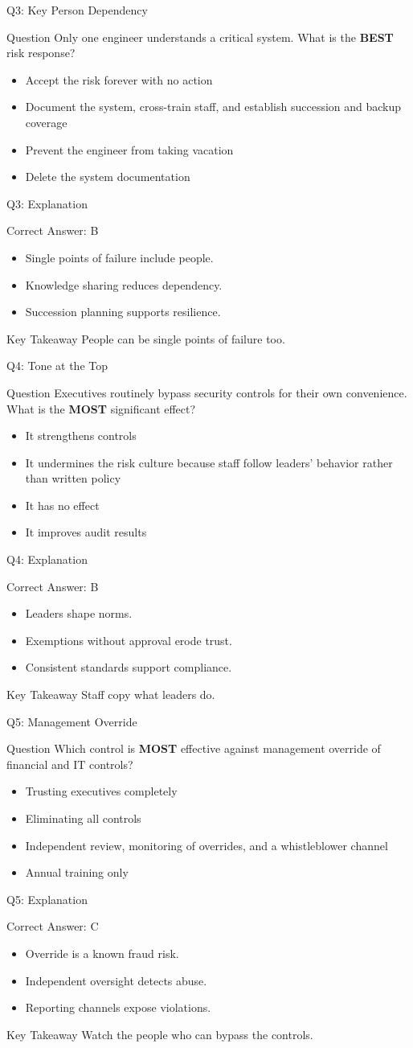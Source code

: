 \documentclass[aspectratio=169]{beamer}
\newcommand{\hq}[7]{%
	\begin{frame}{Q#1: #2}
		\begin{block}{Question}
			#3
		\end{block}
		\begin{itemize}
			#4
		\end{itemize}
	\end{frame}
	\begin{frame}{Q#1: Explanation}
		\begin{block}{Correct Answer: #5}
			\begin{itemize}
				#6
			\end{itemize}
		\end{block}
		\begin{alertblock}{Key Takeaway}
			#7
		\end{alertblock}
	\end{frame}
}
\begin{document}
	\hq{3}{Key Person Dependency}
	{Only one engineer understands a critical system. What is the \textbf{BEST} risk response?}
	{\item[\textbf{(A)}] Accept the risk forever with no action
		\item[\textbf{(B)}] Document the system, cross-train staff, and establish succession and backup coverage
		\item[\textbf{(C)}] Prevent the engineer from taking vacation
		\item[\textbf{(D)}] Delete the system documentation}
	{B}
	{\item Single points of failure include people.
		\item Knowledge sharing reduces dependency.
		\item Succession planning supports resilience.}
	{People can be single points of failure too.}

	\hq{4}{Tone at the Top}
	{Executives routinely bypass security controls for their own convenience. What is the \textbf{MOST} significant effect?}
	{\item[\textbf{(A)}] It strengthens controls
		\item[\textbf{(B)}] It undermines the risk culture because staff follow leaders' behavior rather than written policy
		\item[\textbf{(C)}] It has no effect
		\item[\textbf{(D)}] It improves audit results}
	{B}
	{\item Leaders shape norms.
		\item Exemptions without approval erode trust.
		\item Consistent standards support compliance.}
	{Staff copy what leaders do.}

	\hq{5}{Management Override}
	{Which control is \textbf{MOST} effective against management override of financial and IT controls?}
	{\item[\textbf{(A)}] Trusting executives completely
		\item[\textbf{(B)}] Eliminating all controls
		\item[\textbf{(C)}] Independent review, monitoring of overrides, and a whistleblower channel
		\item[\textbf{(D)}] Annual training only}
	{C}
	{\item Override is a known fraud risk.
		\item Independent oversight detects abuse.
		\item Reporting channels expose violations.}
	{Watch the people who can bypass the controls.}
\end{document}
